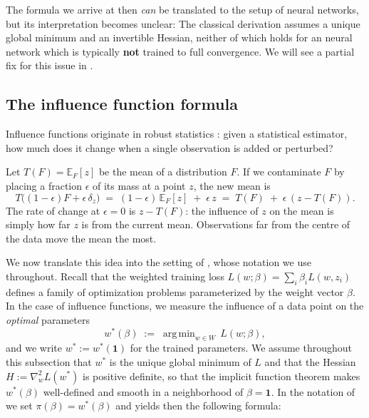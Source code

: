 \documentclass[11pt]{article}
\DeclareMathOperator*{\argmin}{arg\,min}
\begin{document}
The formula we arrive at then \emph{can} be translated to the setup of neural networks, but its interpretation becomes unclear: The classical derivation assumes a unique global minimum and an invertible Hessian, neither of which holds for an neural network which is typically \textbf{not} trained to full convergence. We will see a partial fix for this issue in .

\subsection{The influence function formula}\label{subsec:if-formula}

Influence functions originate in robust statistics \citep{hampel1974}: given a statistical estimator, how much does it change when a single observation is added or perturbed?

\begin{example}\label{ex:mean-if}
Let $T(F) = \mathbb{E}_F[z]$ be the mean of a distribution $F$. If we contaminate $F$ by placing a fraction $\epsilon$ of its mass at a point $z$, the new mean is
\[
  T\bigl((1-\epsilon)F + \epsilon\,\delta_z\bigr) \;=\; (1-\epsilon)\,\mathbb{E}_F[z] \;+\; \epsilon\,z \;=\; T(F) \;+\; \epsilon\,(z - T(F)).
\]
The rate of change at $\epsilon = 0$ is $z - T(F)$: the influence of $z$ on the mean is simply how far $z$ is from the current mean. Observations far from the centre of the data move the mean the most.
\end{example}

We now translate this idea into the setting of , whose notation we use throughout. Recall that the weighted training loss $L(w;\beta) = \sum_i \beta_i L(w,z_i)$ defines a family of optimization problems parameterized by the weight vector $\beta$. In the case of influence functions, we measure the influence of a data point on the \emph{optimal} parameters  
\[
  w^*(\beta) \;:=\; \argmin_{w\in W}\, L(w;\beta),
\]
and we write $w^* := w^*(\mathbf{1})$ for the trained parameters. We assume throughout this subsection that $w^*$ is the unique global minimum of $L$ and that the Hessian $H := \nabla_w^2 L(w^*)$ is positive definite, so that the implicit function theorem makes $w^*(\beta)$ well-defined and smooth in a neighborhood of $\beta=\mathbf{1}$. In the notation of  we set $\pi(\beta)= w^*(\beta)$ and  yields then the following formula:
\end{document}
